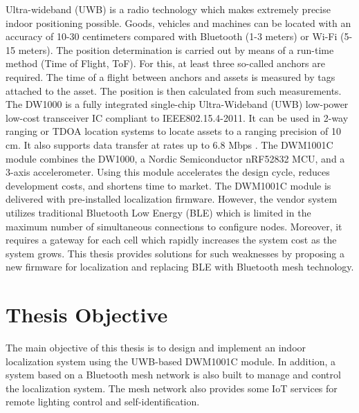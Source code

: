 \documentclass[\main/main.tex]{subfiles}
\begin{document}
Ultra-wideband (UWB) is a radio technology which makes extremely precise indoor positioning possible. Goods, vehicles and machines can be located with an accuracy of 10-30 centimeters compared with Bluetooth (1-3 meters) or Wi-Fi (5-15 meters). The position determination is carried out by means of a run-time method (Time of Flight, ToF). For this, at least three so-called anchors are required. The time of a flight between anchors and assets is measured by tags attached to the asset. The position is then calculated from such measurements.
\newline\newline
The DW1000 is a fully integrated single-chip Ultra-Wideband (UWB) low-power low-cost transceiver IC compliant to IEEE802.15.4-2011. It can be used in 2-way ranging or TDOA location systems to locate assets to a ranging precision of 10 cm. It also supports data transfer at rates up to 6.8 Mbps \cite{decawave:dw1000_datasheet}.
\newline\newline
The DWM1001C module combines the DW1000, a Nordic Semiconductor nRF52832 MCU, and a 3-axis accelerometer. Using this module accelerates the design cycle, reduces development costs, and shortens time to market.
\newline\newline
The DWM1001C module is delivered with pre-installed localization firmware. However, the vendor system utilizes traditional Bluetooth Low Energy (BLE) which is limited in the maximum number of simultaneous connections to configure nodes. Moreover, it requires a gateway for each cell which rapidly increases the system cost as the system grows. This thesis provides solutions for such weaknesses by proposing a new firmware for localization and replacing BLE with Bluetooth mesh technology.

\section{Thesis Objective}
The main objective of this thesis is to design and implement an indoor localization system using the UWB-based DWM1001C module. In addition, a system based on a Bluetooth mesh network is also built to manage and control the localization system. The mesh network also provides some IoT services for remote lighting control and self-identification.

\end{document}
